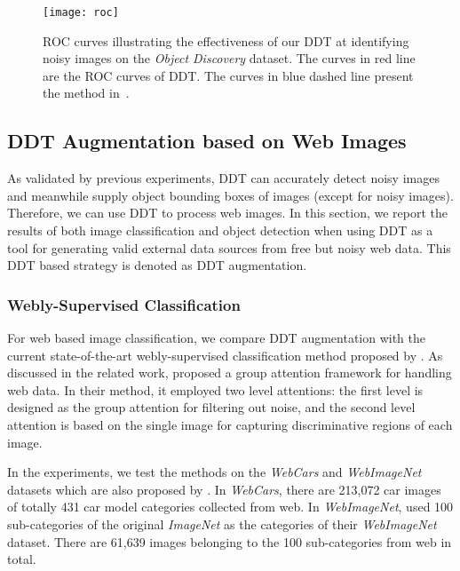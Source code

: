 \documentclass[twocolumn]{svjour3}          \smartqed  \usepackage{graphicx}
\begin{document}
\begin{figure}[t]
 \centering
 \texttt{[image: roc]}
\caption{ROC curves illustrating the effectiveness of our DDT at identifying noisy images on the \emph{Object Discovery} dataset. The curves in red line are the ROC curves of DDT. The curves in blue dashed line present the method in~\citet{tangcvpr2014}.}
 \label{fig:roc}
\end{figure}

\subsection{DDT Augmentation based on Web Images}\label{sec:web}

As validated by previous experiments, DDT can accurately detect noisy images and meanwhile supply object bounding boxes of images (except for noisy images). Therefore, we can use DDT to process web images. In this section, we report the results of both image classification and object detection when using DDT as a tool for generating valid external data sources from free but noisy web data. This DDT based strategy is denoted as DDT augmentation.

\subsubsection{Webly-Supervised Classification}

For web based image classification, we compare DDT augmentation with the current state-of-the-art webly-supervised classification method proposed by \citet{bohan2017}. As discussed in the related work, \citet{bohan2017} proposed a group attention framework for handling web data. In their method, it employed two level attentions: the first level is designed as the group attention for filtering out noise, and the second level attention is based on the single image for capturing discriminative regions of each image.

In the experiments, we test the methods on the \emph{WebCars} and \emph{WebImageNet} datasets which are also proposed by \citet{bohan2017}. In \emph{WebCars}, there are 213,072 car images of totally 431 car model categories collected from web. In \emph{WebImageNet}, \citet{bohan2017} used 100 sub-categories of the original \emph{ImageNet} as the categories of their \emph{WebImageNet} dataset. There are 61,639 images belonging to the 100 sub-categories from web in total.
\end{document}
